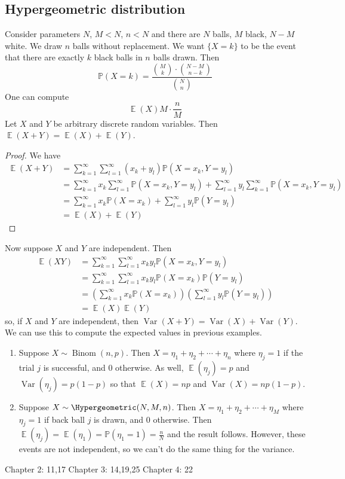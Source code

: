 \documentclass[12pt, a4paper]{book}
\DeclareMathOperator{\E}{\mathbb{E}}
\DeclareMathOperator{\Binom}{Binom}
\DeclareMathOperator{\Var}{Var}
\renewcommand{\Pr}{\mathbb{P}}
\theoremstyle{nonumberplain}
\newtheorem{proof}{Proof}
\begin{document}
\subsection{Hypergeometric distribution}
Consider parameters $N$, $M<N$, $n<N$ and there are $N$ balls, $M$ black, $N-M$ white.
We draw $n$ balls without replacement.
We want $\{X=k\}$ to be the event that there are exactly $k$ black balls in $n$ balls drawn.
Then
\[\Pr(X=k)=\frac{\binom{M}{k}\cdot\binom{N-M}{n-k}}{\binom{N}{n}}\]
One can compute
\[\E(X)M\cdot\frac{n}{M}\]
Let $X$ and $Y$ be arbitrary discrete random variables.
Then $\E(X+Y)=\E(X)+\E(Y)$.
\begin{proof}
    We have
    \begin{align*}
        \E(X+Y)&=\sum\limits_{k=1}^\infty\sum\limits_{l=1}^\infty(x_k+y_l)\Pr(X=x_k,Y=y_l)\\
               &=\sum\limits_{k=1}^\infty x_k\sum\limits_{l=1}^\infty\Pr(X=x_k,Y=y_l)+\sum\limits_{l=1}^\infty y_l\sum\limits_{k=1}^\infty\Pr(X=x_k,Y=y_l)\\
               &=\sum\limits_{k=1}^\infty x_k\Pr(X=x_k)+\sum\limits_{l=1}^\infty y_l\Pr(Y=y_l)\\
               &= \E(X)+\E(Y)
    \end{align*}
\end{proof}
Now suppose $X$ and $Y$ are independent.
Then
\begin{align*}
    \E(XY) &= \sum\limits_{k=1}^\infty\sum\limits_{l=1}^\infty x_ky_l\Pr(X=x_k,Y=y_l)\\
           &= \sum\limits_{k=1}^\infty\sum\limits_{l=1}^\infty x_ky_l\Pr(X=x_k)\Pr(Y=y_l)\\
           &= \left(\sum\limits_{k=1}^\infty x_k\Pr(X=x_k)\right)\left(\sum\limits_{l=1}^\infty y_l\Pr(Y=y_l)\right)\\
           &=\E(X)\E(Y)
\end{align*}
so, if $X$ and $Y$ are independent, then $\Var(X+Y)=\Var(X)+\Var(Y)$.
We can use this to compute the expected values in previous examples.
\begin{enumerate}
    \item Suppose $X\sim\Binom(n,p)$.
        Then $X=\eta_1+\eta_2+\cdots+\eta_n$ where $\eta_j=1$ if the trial $j$ is successful, and 0 otherwise.
        As well, $\E(\eta_j)=p$ and $\Var(\eta_j)=p(1-p)$ so that $\E(X)=np$ and $\Var(X)=np(1-p)$.
    \item Suppose $X\sim\Hypergeometric(N,M,n)$.
        Then $X=\eta_1+\eta_2+\cdots+\eta_M$ where $\eta_j=1$ if back ball $j$ is drawn, and $0$ otherwise.
        Then $\E(\eta_j)=\E(\eta_1)=\Pr(\eta_1=1)=\frac{n}{N}$ and the result follows.
        However, these events are not independent, so we can't do the same thing for the variance.
\end{enumerate}


Chapter 2: 11,17
Chapter 3: 14,19,25
Chapter 4: 22
\end{document}
